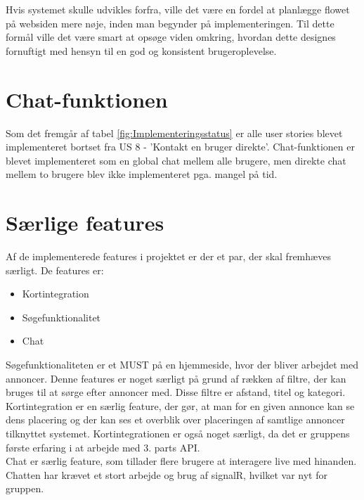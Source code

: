 Hvis systemet skulle udvikles forfra, ville det være en fordel at planlægge flowet på websiden mere nøje, inden man begynder på implementeringen. Til dette formål ville det være smart at opsøge viden omkring, hvordan dette designes fornuftigt med hensyn til en god og konsistent brugeroplevelse.

\section{Chat-funktionen}
Som det fremgår af tabel \ref{fig:Implementeringsstatus} er alle user stories blevet implementeret bortset fra US 8 - 'Kontakt en bruger direkte'. Chat-funktionen er blevet implementeret som en global chat mellem alle brugere, men direkte chat mellem to brugere blev ikke implementeret pga. mangel på tid.

	
\section{Særlige features}
Af de implementerede features i projektet er der et par, der skal fremhæves særligt.
De features er:
\begin{itemize}[noitemsep]
	\item Kortintegration
	\item Søgefunktionalitet 
	\item Chat
\end{itemize}

Søgefunktionaliteten er et MUST på en hjemmeside, hvor der bliver arbejdet med annoncer. Denne features er noget særligt på grund af rækken af filtre, der kan bruges til at sørge efter annoncer med. Disse filtre er afstand, titel og kategori. \\

Kortintegration er en særlig feature, der gør, at man for en given annonce kan se dens placering og der kan ses et overblik over  placeringen af samtlige annoncer tilknyttet systemet. Kortintegrationen er også noget særligt, da det er gruppens første erfaring i at arbejde med 3. parts API. \\

Chat er særlig feature, som tillader flere brugere at interagere live med hinanden. Chatten har krævet et stort arbejde og brug af signalR, hvilket var nyt for gruppen.




 